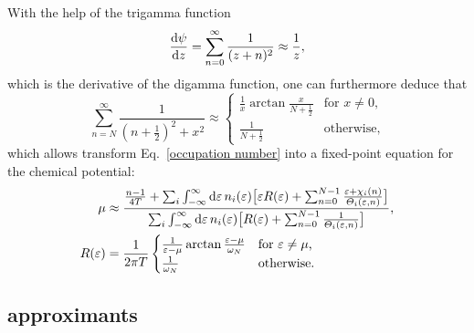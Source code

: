 %
With the help of the trigamma function
%
\begin{align*}
   \frac{\mathrm d \psi}{\mathrm d z} = \sum_{n = 0}^\infty \frac 1 {(z + n)^2}
   \approx \frac 1 z,
\end{align*}
%
which is the derivative of the digamma function, one can furthermore deduce that
%
\begin{equation*}
   \sum_{n = N}^\infty \frac 1 {(n + \tfrac 1 2)^2 + x^2}
   \approx
   \begin{cases}
      \frac 1 x \arctan \frac x {N + \frac 1 2}
         & \text{for $x \neq 0$,} \\
      \frac 1 {N + \frac 1 2}
         & \text{otherwise,}
   \end{cases}
\end{equation*}
%
which allows transform Eq.~\ref{occupation number} into a fixed-point equation
for the chemical potential:
%
\begin{align*}
   \mu &\approx \frac
   {
      \frac{n - 1}{4 T}
      + \sum_i \int_{-\infty}^\infty \mathrm d \varepsilon \, n_i(\varepsilon)
      \big[
         \varepsilon R(\varepsilon) + \sum_{n = 0}^{N - 1}
         \frac{\varepsilon + \chi_i(n)}{\varTheta_i(\varepsilon, n)}
      \big]
   }
   {
      \sum_i \int_{-\infty}^\infty \mathrm d \varepsilon \, n_i(\varepsilon)
      \big[
         R(\varepsilon) + \sum_{n = 0}^{N - 1} \frac 1 {\varTheta_i(\varepsilon, n)}
      \big]
   },
   \\
   R(\varepsilon) &= \frac 1 {2 \pi T}
   \begin{cases}
      \frac 1 {\varepsilon - \mu} \arctan \frac{\varepsilon - \mu}{\omega_N}
         & \text{for $\varepsilon \neq \mu$,} \\
      \frac 1 {\omega_N}
         & \text{otherwise.}
   \end{cases}
\end{align*}

\subsection{ approximants}
